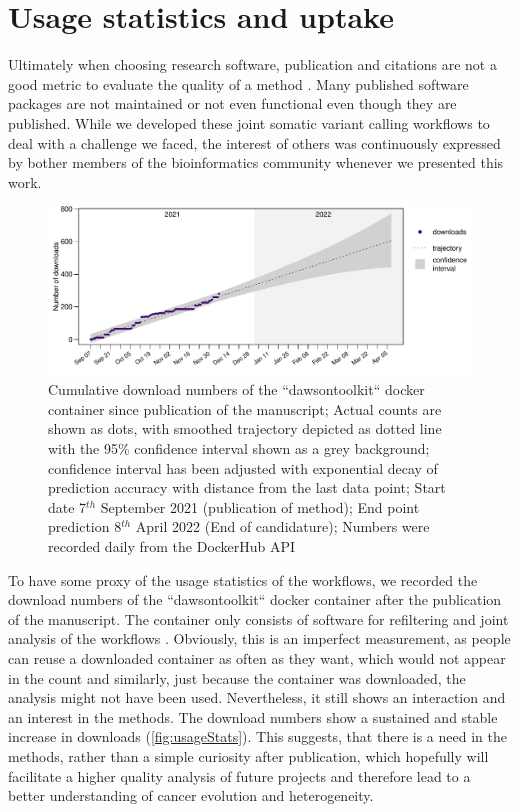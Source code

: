\section[Usage]{Usage statistics and uptake}
\label{variantcalling-sec:usage}
Ultimately when choosing research software, publication and citations are not a good metric to evaluate the quality of a method \cite{Gardner2022}. Many published software packages are not maintained or not even functional even though they are published. While we developed these joint somatic variant calling workflows to deal with a challenge we faced, the interest of others was continuously expressed by bother members of the bioinformatics community whenever we presented this work.

\begin{figure}[!ht]
\centering
\includegraphics[width=.99\linewidth]{Figures/dawsontoolkitDownloads.pdf}
\caption[Usage statistics joint workflows]{Cumulative download numbers of the ``dawsontoolkit`` docker container since publication of the manuscript; Actual counts are shown as dots, with smoothed trajectory depicted as dotted line with the 95\% confidence interval shown as a grey background; confidence interval has been adjusted with exponential decay of prediction accuracy with distance from the last data point; Start date 7$^{th}$ September 2021 (publication of method); End point prediction 8$^{th}$ April 2022 (End of candidature); Numbers were recorded daily from the DockerHub API}\label{fig:usageStats}
\end{figure}

To have some proxy of the usage statistics of the workflows, we recorded the download numbers of the ``dawsontoolkit`` docker container after the publication of the manuscript. The container only consists of software for refiltering and joint analysis of the workflows . Obviously, this is an imperfect measurement, as people can reuse a downloaded container as often as they want, which would not appear in the count and similarly, just because the container was downloaded, the analysis might not have been used. Nevertheless, it still shows  an interaction and an interest in the methods. The download numbers show a sustained and stable increase in downloads (\autoref{fig:usageStats}). This suggests, that there is a need in the methods, rather than a simple curiosity after publication, which hopefully will facilitate a higher quality analysis of future projects and therefore lead to a better understanding of cancer evolution and heterogeneity.
